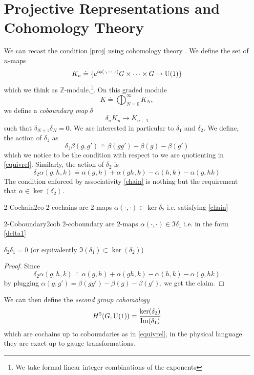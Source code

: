 \section{Projective Representations and Cohomology Theory}
We can recast the condition \eqref{proj} using cohomology theory \cite{Tachikawa:2017gyf}. We define the set of $n$-maps
\begin{equation}
    K_n \doteq \{e^{i\phi(\cdot, \cdots, \cdot)} G \times \cdots \times G \to \mathrm{U}(1)\}
\end{equation} 
which we think as $\mathbb{Z}$-module.\footnote{We take formal linear integer combinations of the exponents}. On this graded module 
\begin{equation}
	K \doteq \bigoplus_{N=0}^{\infty} K_N,
\end{equation}
we define a \textit{coboundary map} $\delta$
\begin{equation}
    \delta_n  K_n \to K_{n+1}
\end{equation}
such that $\delta_{N+1}  \delta_N = 0$. We are interested in particular to $\delta_1$ and $\delta_2$. We define, the action of $\delta_1$ as
\begin{equation}\label{delta1}
    \delta_1 \beta(g,g') \doteq \beta(gg') -\beta(g) -\beta(g')
\end{equation}
which we notice to be the condition with respect to we are quotienting in \eqref{equivrel}. Similarly, the action of $\delta_2$ is
\begin{equation}
    \delta_2 \alpha(g,h,k) \doteq \alpha(g,h) + \alpha(gh,k) - \alpha(h,k) -\alpha(g,hk)
\end{equation}
The condition enforced by associativity \eqref{chain} is nothing but the requirement that $\alpha \in \ker(\delta_2)$. 

\begin{defn}{2-Cochain}{2co}
	$2$-cochains are $2$-maps $\alpha(\cdot, \cdot) \in \ker \delta_2$ i.e. satisfying \eqref{chain} 
\end{defn}
\begin{defn}{2-Coboundary}{2cob}
	$2$-coboundary are $2$-maps $\alpha(\cdot, \cdot) \in \Im \delta_1$ i.e. in the form \eqref{delta1}\\
\end{defn}

\begin{proposition}
    $\delta_2 \delta_1=0$ (or equivalently $\Im(\delta_1) \subset \ker(\delta_2)$)
\end{proposition}
\begin{proof}
    Since
\begin{equation}
    \delta_2 \alpha(g,h,k) \doteq \alpha(g,h) + \alpha(gh,k) - \alpha(h,k) -\alpha(g,hk)
\end{equation}
by plugging $\alpha(g,g') = \beta(gg') -\beta(g) -\beta(g')$, we get the claim.
\end{proof}
We can then define the \textit{second group cohomology}
\begin{equation}
    H^2(G, \U(1)) = \frac{\ker(\delta_2)}{\Im(\delta_1)}
\end{equation}
which are cochains up to coboundaries as in \eqref{equivrel}, in the physical language they are exact up to gauge transformations.\\

